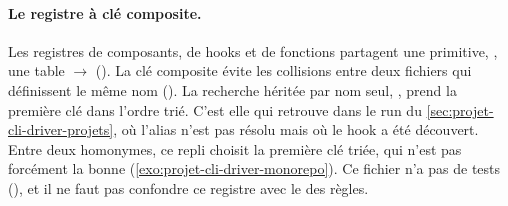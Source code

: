 \paragraph{Le registre à clé composite.} Les registres de composants, de hooks et de fonctions partagent une primitive, , une table  $\to$  (). La clé composite évite les collisions entre deux fichiers qui définissent le même nom (). La recherche héritée par nom seul, , prend la première clé dans l'ordre trié. C'est elle qui retrouve  dans le run  du \cref{sec:projet-cli-driver-projets}, où l'alias n'est pas résolu mais où le hook a été découvert. Entre deux homonymes, ce repli choisit la première clé triée, qui n'est pas forcément la bonne (\cref{exo:projet-cli-driver-monorepo}). Ce fichier n'a pas de tests (), et il ne faut pas confondre ce registre avec le  des règles.

